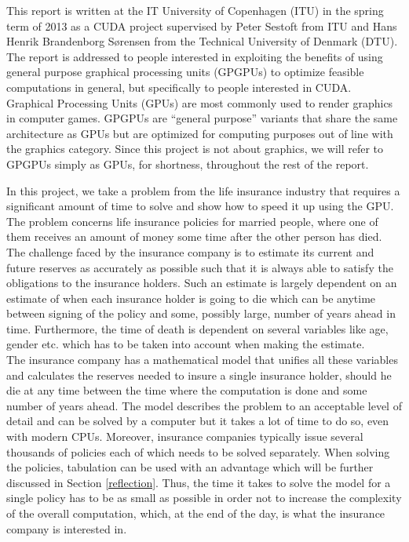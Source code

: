 This report is written at the IT University of Copenhagen (ITU) in the spring term of 2013 as a CUDA project supervised by Peter Sestoft from ITU and Hans Henrik Brandenborg Sørensen from the Technical University of Denmark (DTU). The report is addressed to people interested in exploiting the benefits of using general purpose graphical processing units (GPGPUs) to optimize feasible computations in general, but specifically to people interested in CUDA. \\

Graphical Processing Units (GPUs) are most commonly used to render graphics in computer games. GPGPUs are ``general purpose'' variants that share the same architecture as GPUs but are optimized for computing purposes out of line with the graphics category. Since this project is not about graphics, we will refer to GPGPUs simply as GPUs, for shortness, throughout the rest of the report.

In this project, we take a problem from the life insurance industry that requires a significant amount of time to solve and show how to speed it up using the GPU. The problem concerns life insurance policies for married people, where one of them receives an amount of money some time after the other person has died. The challenge faced by the insurance company is to estimate its current and future reserves as accurately as possible such that it is always able to satisfy the obligations to the insurance holders. Such an estimate is largely dependent on an estimate of when each insurance holder is going to die which can be anytime between signing of the policy and some, possibly large, number of years ahead in time. Furthermore, the time of death is dependent on several variables like age, gender etc. which has to be taken into account when making the estimate.\\

The insurance company has a mathematical model that unifies all these variables and calculates the reserves needed to insure a single insurance holder, should he die at any time between the time where the computation is done and some number of years ahead. The model describes the problem to an acceptable level of detail and can be solved by a computer but it takes a lot of time to do so, even with modern CPUs. Moreover, insurance companies typically issue several thousands of policies each of which needs to be solved separately. When solving the policies, tabulation can be used with an advantage which will be further discussed in Section \ref{reflection}. Thus, the time it takes to solve the model for a single policy has to be as small as possible in order not to increase the complexity of the overall computation, which, at the end of the day, is what the insurance company is interested in. \\

